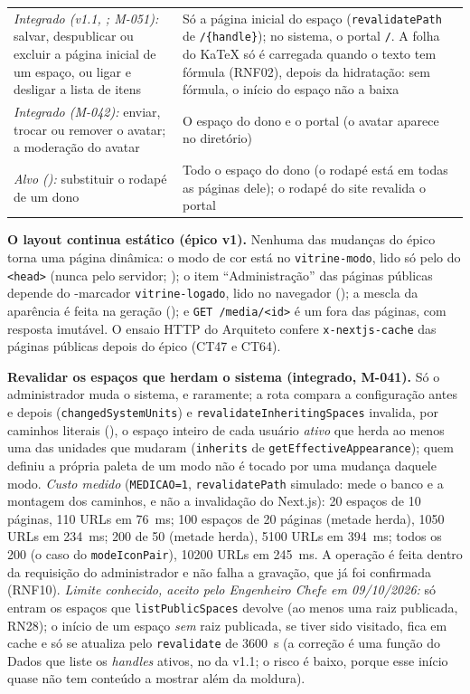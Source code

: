 \begin{table}[htb]
\begin{tabularx}{\linewidth}{@{}L{5.2cm}Y@{}}
\emph{Integrado (v1.1, ; M-051):} salvar, despublicar ou excluir a página inicial de um espaço, ou ligar e desligar a lista de itens & Só a página inicial do espaço (\texttt{revalidatePath} de \texttt{/\{handle\}}); no sistema, o portal \texttt{/}. A folha do KaTeX só é carregada quando o texto tem fórmula (RNF02), depois da hidratação: sem fórmula, o início do espaço não a baixa\\
\addlinespace
\emph{Integrado (M-042):} enviar, trocar ou remover o avatar; a moderação do avatar & O espaço do dono e o portal (o avatar aparece no diretório)\\
\addlinespace
\emph{Alvo ():} substituir o rodapé de um dono & Todo o espaço do dono (o rodapé está em todas as páginas dele); o rodapé do site revalida o portal\\
\bottomrule
\end{tabularx}
\end{table}

\textbf{O layout continua estático (épico v1).} Nenhuma das mudanças do épico torna uma página dinâmica: o modo de cor está no  \texttt{vitrine-modo}, lido só pelo  do \texttt{<head>} (nunca pelo servidor; ); o item ``Administração'' das páginas públicas depende do -marcador \texttt{vitrine-logado}, lido no navegador (); a mescla da aparência é feita na geração (); e \texttt{GET /media/<id>} é um  fora das páginas, com resposta imutável. O ensaio HTTP do Arquiteto confere \texttt{x-nextjs-cache} das páginas públicas depois do épico (CT47 e CT64).

\textbf{Revalidar os espaços que herdam o sistema (integrado, M-041).} Só o administrador muda o sistema, e raramente; a rota compara a configuração antes e depois (\texttt{changedSystemUnits}) e \texttt{revalidateInheritingSpaces} invalida, por caminhos literais (), o espaço inteiro de cada usuário \emph{ativo} que herda ao menos uma das unidades que mudaram (\texttt{inherits} de \texttt{getEffectiveAppearance}); quem definiu a própria paleta de um modo não é tocado por uma mudança daquele modo. \emph{Custo medido} (\texttt{MEDICAO=1}, \texttt{revalidatePath} simulado: mede o banco e a montagem dos caminhos, e não a invalidação do Next.js): 20 espaços de 10 páginas, 110 URLs em 76~ms; 100 espaços de 20 páginas (metade herda), 1050 URLs em 234~ms; 200 de 50 (metade herda), 5100 URLs em 394~ms; todos os 200 (o caso do \texttt{modeIconPair}), 10200 URLs em 245~ms. A operação é feita dentro da requisição do administrador e não falha a gravação, que já foi confirmada (RNF10). \emph{Limite conhecido, aceito pelo Engenheiro Chefe em 09/10/2026:} só entram os espaços que \texttt{listPublicSpaces} devolve (ao menos uma raiz publicada, RN28); o início de um espaço \emph{sem} raiz publicada, se tiver sido visitado, fica em cache e só se atualiza pelo \texttt{revalidate} de 3600~s (a correção é uma função do Dados que liste os \emph{handles} ativos, no  da v1.1; o risco é baixo, porque esse início quase não tem conteúdo a mostrar além da moldura).

